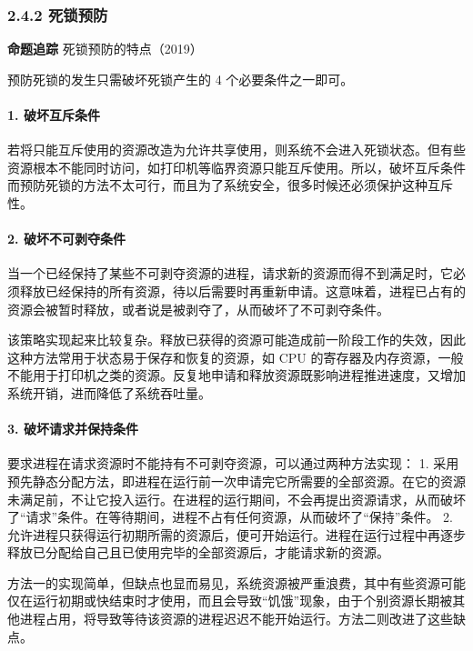 \documentclass{ctexbook}
\begin{document}
	\subsubsection{2.4.2 死锁预防}
	
	\textbf{命题追踪} 死锁预防的特点（2019）
	
	预防死锁的发生只需破坏死锁产生的 4 个必要条件之一即可。
	
	\paragraph{1. 破坏互斥条件}
	
	若将只能互斥使用的资源改造为允许共享使用，则系统不会进入死锁状态。但有些资源根本不能同时访问，如打印机等临界资源只能互斥使用。所以，破坏互斥条件而预防死锁的方法不太可行，而且为了系统安全，很多时候还必须保护这种互斥性。
	
	\paragraph{2. 破坏不可剥夺条件}
	
	当一个已经保持了某些不可剥夺资源的进程，请求新的资源而得不到满足时，它必须释放已经保持的所有资源，待以后需要时再重新申请。这意味着，进程已占有的资源会被暂时释放，或者说是被剥夺了，从而破坏了不可剥夺条件。
	
	该策略实现起来比较复杂。释放已获得的资源可能造成前一阶段工作的失效，因此这种方法常用于状态易于保存和恢复的资源，如 CPU 的寄存器及内存资源，一般不能用于打印机之类的资源。反复地申请和释放资源既影响进程推进速度，又增加系统开销，进而降低了系统吞吐量。
	
	\paragraph{3. 破坏请求并保持条件}
	
	要求进程在请求资源时不能持有不可剥夺资源，可以通过两种方法实现：
	1. 采用预先静态分配方法，即进程在运行前一次申请完它所需要的全部资源。在它的资源未满足前，不让它投入运行。在进程的运行期间，不会再提出资源请求，从而破坏了“请求”条件。在等待期间，进程不占有任何资源，从而破坏了“保持”条件。
	2. 允许进程只获得运行初期所需的资源后，便可开始运行。进程在运行过程中再逐步释放已分配给自己且已使用完毕的全部资源后，才能请求新的资源。
	
	方法一的实现简单，但缺点也显而易见，系统资源被严重浪费，其中有些资源可能仅在运行初期或快结束时才使用，而且会导致“饥饿”现象，由于个别资源长期被其他进程占用，将导致等待该资源的进程迟迟不能开始运行。方法二则改进了这些缺点。
	
\end{document}
